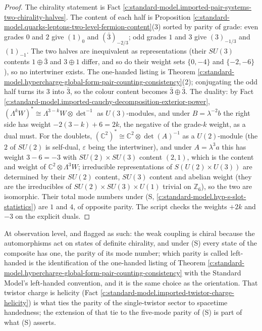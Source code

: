 \documentclass[11pt]{article}
\theoremstyle{definition}
\theoremstyle{plain}
\providecommand{\C}{}\renewcommand{\C}{\mathbb{C}}
\begin{document}
\begin{proof}
The chirality statement is Fact \ref{c:standard-model.imported-pair-systems-two-chirality-halves}. The content of each half is Proposition \ref{c:standard-model.quarks-leptons-two-level-fermion-content}(3) sorted by parity of grade: even grades $0$ and $2$ give $(1)_{0}$ and $(\bar{3})_{-2/3}$; odd grades $1$ and $3$ give $(3)_{-1/3}$ and $(1)_{-1}$. The two halves are inequivalent as representations (their $SU(3)$ contents $1 \oplus \bar{3}$ and $3 \oplus 1$ differ, and so do their weight sets $\{0, -4\}$ and $\{-2, -6\}$), so no intertwiner exists. The one-handed listing is Theorem \ref{c:standard-model.hypercharge-global-form-pair-counting-consistency}(2); conjugating the odd half turns its $3$ into $\bar{3}$, so the colour content becomes $\bar{3} \oplus \bar{3}$. The duality: by Fact \ref{c:standard-model.imported-cauchy-decomposition-exterior-power}, $(\Lambda^{k}W)^{*} \cong \Lambda^{3-k}W \otimes \det^{-1}$ as $U(3)$-modules, and under $B = \lambda^{-2}b$ the right side has weight $-2(3-k) + 6 = 2k$, the negative of the grade-$k$ weight, as a dual must. For the doublets, $(\C^{2})^{*} \cong \C^{2} \otimes \det(A)^{-1}$ as a $U(2)$-module (the $2$ of $SU(2)$ is self-dual, $\varepsilon$ being the intertwiner), and under $A = \lambda^{3}a$ this has weight $3 - 6 = -3$ with $SU(2) \times SU(3)$ content $(2, 1)$, which is the content and weight of $\C^{2} \otimes \Lambda^{3}W$; irreducible representations of $S(U(2) \times U(3))$ are determined by their $SU(2)$ content, $SU(3)$ content and abelian weight (they are the irreducibles of $SU(2) \times SU(3) \times U(1)$ trivial on $\mathbb{Z}_{6}$), so the two are isomorphic. Their total mode numbers under (S, \ref{c:standard-model.hyp-s-slot-statistics}) are $1$ and $4$, of opposite parity. The script checks the weights $+2k$ and $-3$ on the explicit duals.

\end{proof}

\label{c:note.standard-model.setting-content-charges-chirality-3}
At observation level, and flagged as such: the weak coupling is chiral because the automorphisms act on states of definite chirality, and under (S) every state of the composite has one, the parity of its mode number; which parity is called left-handed is the identification of the one-handed listing of Theorem \ref{c:standard-model.hypercharge-global-form-pair-counting-consistency} with the Standard Model's left-handed convention, and it is the same choice as the orientation. That twistor charge is helicity (Fact \ref{c:standard-model.imported-twistor-charge-helicity}) is what ties the parity of the single-twistor sector to spacetime handedness; the extension of that tie to the five-mode parity of (S) is part of what (S) asserts.
\end{document}
